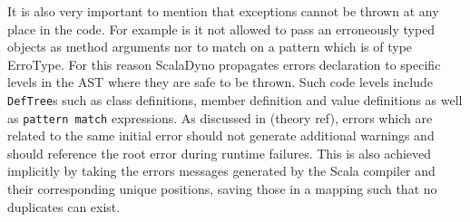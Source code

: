 It is also very important to mention that exceptions cannot be thrown at any place in the code. For example is it not allowed to pass an erroneously typed objects as method arguments nor to match on a pattern which is of type ErroType. For this reason ScalaDyno propagates errors declaration to specific levels in the AST where they are safe to be thrown. Such code levels include \texttt{DefTree}s such as class definitions, member definition and value definitions as well as \texttt{pattern match} expressions. As discussed in (theory ref), errors which are related to the same initial error should not generate additional warnings and should reference the root error during runtime failures. This is also achieved implicitly by taking the errors messages generated by the Scala compiler and their corresponding unique positions, saving those in a mapping such that no duplicates can exist.
